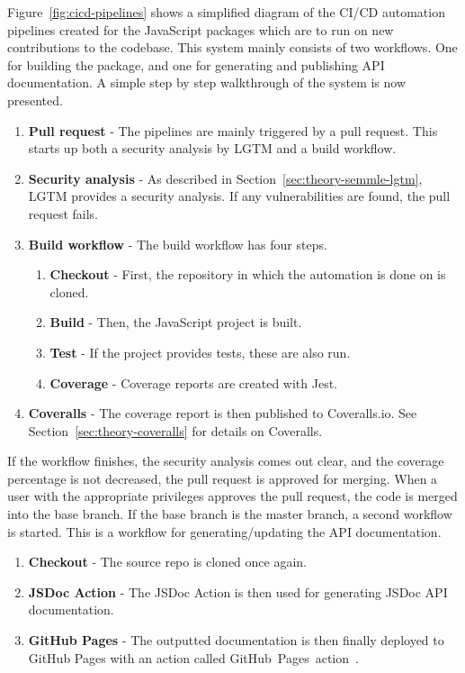 Figure~\ref{fig:cicd-pipelines} shows a simplified diagram of the CI/CD automation pipelines created for the JavaScript packages which are to run on new contributions to the codebase. This system mainly consists of two workflows. One for building the package, and one for generating and publishing API documentation. A simple step by step walkthrough of the system is now presented.

\begin{enumerate}
    \item \textbf{Pull request} - The pipelines are mainly triggered by a pull request. This starts up both a security analysis by LGTM and a build workflow.
    \item \textbf{Security analysis} - As described in Section~\ref{sec:theory-semmle-lgtm}, LGTM provides a security analysis. If any vulnerabilities are found, the pull request fails.
    \item \textbf{Build workflow} - The build workflow has four steps.
    \begin{enumerate}
        \item \textbf{Checkout} - First, the repository in which the automation is done on is cloned.
        \item \textbf{Build} - Then, the JavaScript project is built.
        \item \textbf{Test} - If the project provides tests, these are also run.
        \item \textbf{Coverage} - Coverage reports are created with Jest.
    \end{enumerate}
    \item \textbf{Coveralls} - The coverage report is then published to Coveralls.io. See Section~\ref{sec:theory-coveralls} for details on Coveralls.
\end{enumerate}

If the workflow finishes, the security analysis comes out clear, and the coverage percentage is not decreased, the pull request is approved for merging. When a user with the appropriate privileges approves the pull request, the code is merged into the base branch. If the base branch is the master branch, a second workflow is started. This is a workflow for generating/updating the API documentation.

\begin{enumerate}
    \item \textbf{Checkout} - The source repo is cloned once again.
    \item \textbf{JSDoc Action} - The JSDoc Action is then used for generating JSDoc API documentation.
    \item \textbf{GitHub Pages} - The outputted documentation is then finally deployed to GitHub Pages with an action called GitHub~Pages~action~\cite{github-pages-action}.
\end{enumerate}

